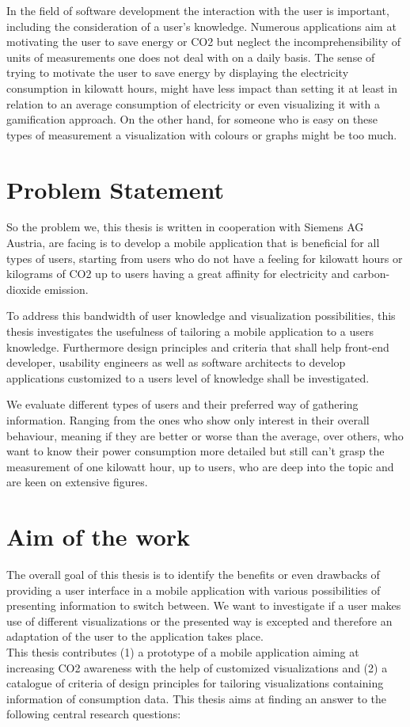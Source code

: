In the field of software development the interaction with the user is important, including the consideration of a user's knowledge. Numerous applications aim at motivating the user to save energy or CO2 but neglect the incomprehensibility of units of measurements one does not deal with on a daily basis. The sense of trying to motivate the user to save energy by displaying the electricity consumption in kilowatt hours, might have less impact than setting it at least in relation to an average consumption of electricity or even visualizing it with a gamification approach. On the other hand, for someone who is easy on these types of measurement a visualization with colours or graphs might be too much.

\section{Problem Statement}

So the problem we, this thesis is written in cooperation with Siemens AG Austria, are facing is to develop a mobile application that is beneficial for all types of users, starting from users who do not have a feeling for kilowatt hours or kilograms of CO2 up to users having a great affinity for electricity and carbon-dioxide emission.

To address this bandwidth of user knowledge and visualization possibilities, this thesis investigates the usefulness of tailoring a mobile application to a users knowledge. Furthermore design principles and criteria that shall help front-end developer, usability engineers as well as software architects to develop applications customized to a users level of knowledge shall be investigated.

We evaluate different types of users and their preferred way of gathering information. Ranging from the ones who show only interest in their overall behaviour, meaning if they are better or worse than the average, over others, who want to know their power consumption more detailed but still can't grasp the measurement of one kilowatt hour, up to users, who are deep into the topic and are keen on extensive figures.

\section{Aim of the work} 
The overall goal of this thesis is to identify the benefits or even drawbacks of providing a user interface in a mobile application with various possibilities of presenting information to switch between. We want to investigate if a user makes use of different visualizations or the presented way is excepted and therefore an adaptation of the user to the application takes place.\\
This thesis contributes 
(1) a prototype of a mobile application aiming at increasing CO2 awareness with the help of customized visualizations and
(2) a catalogue of criteria of design principles for tailoring visualizations containing information of consumption data.
This thesis aims at finding an answer to the following central research questions:

